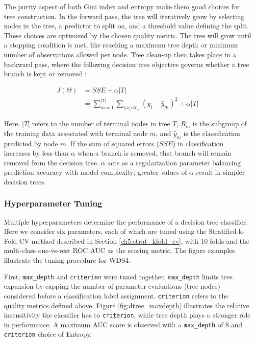 The purity aspect of both Gini index and entropy make them good choices for tree construction. In the forward pass, the tree will iteratively grow by selecting nodes in the tree, a predictor to split on, and a threshold value defining the split. These choices are optimized by the chosen quality metric. The tree will grow until a stopping condition is met, like reaching a maximum tree depth or minimum number of observations allowed per node. Tree clean-up then takes place in a backward pass, where the following decision tree objective governs whether a tree branch is kept or removed \citep[p. 309]{james_introduction_2013}:

\begin{equation}
\label{dtree_objective}
\begin{aligned}
    J(\Theta) &= SSE + \alpha\left|T\right| \\
    &= \sum_{m=1}^{\left|T\right|}{\sum_{i|x_i\epsilon R_m}}{(y_i-\hat{y}_m)^2+\alpha\left|T\right|}
\end{aligned}
\end{equation}

Here, $\left|T\right|$ refers to the number of terminal nodes in tree $T$, $R_m$ is the subgroup of the training data associated with terminal node $m$, and $\hat{y}_m$ is the classification predicted by node $m$. If the sum of squared errors ($SSE$) in classification increases by less than $\alpha$ when a branch is removed, that branch will remain removed from the decision tree. $\alpha$ acts as a regularization parameter balancing prediction accuracy with model complexity; greater values of $\alpha$ result in simpler decision trees.

\subsubsection{Hyperparameter Tuning} \label{ch5:dtree_tuning}
Multiple hyperparameters determine the performance of a decision tree classifier. Here we consider six parameters, each of which are tuned using the Stratified k-Fold CV method described in Section \ref{ch5:strat_kfold_cv}, with 10 folds and the multi-class one-vs-rest ROC AUC as the scoring metric. The figure examples illustrate the tuning procedure for WDS4.

First, \verb|max_depth| and \verb|criterion| were tuned together. \verb|max_depth| limits tree expansion by capping the number of parameter evaluations (tree nodes) considered before a classification label assignment. \verb|criterion| refers to the quality metrics defined above. Figure \ref{fig:dtree_maxdepth} illustrates the relative insensitivity the classifier has to \verb|criterion|, while tree depth plays a stronger role in performance. A maximum AUC score is observed with a \verb|max_depth| of 8 and \verb|criterion| choice of Entropy.

